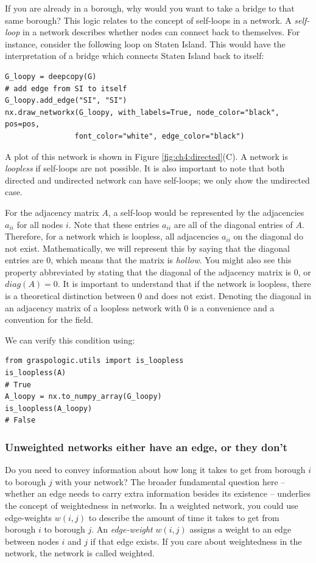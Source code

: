 If you are already in a borough, why would you want to take a bridge to that same borough? This logic relates to the concept of {self-loops} in a network. A \textit{self-loop} in a network describes whether nodes can connect back to themselves. For instance, consider the following loop on Staten Island. This would have the interpretation of a bridge which connects Staten Island back to itself:
\begin{lstlisting}[style=python]
G_loopy = deepcopy(G)
# add edge from SI to itself
G_loopy.add_edge("SI", "SI")
nx.draw_networkx(G_loopy, with_labels=True, node_color="black", pos=pos,
                font_color="white", edge_color="black")
\end{lstlisting}

A plot of this network is shown in Figure \ref{fig:ch4:directed}(C). A network is \textit{loopless} if self-loops are not possible. It is also important to note that both directed and undirected network can have self-loops; we only show the undirected case.

For the adjacency matrix $A$, a self-loop would be represented by the adjacencies $a_{ii}$ for all nodes $i$. Note that these entries $a_{ii}$ are all of the {diagonal} entries of $A$. Therefore, for a network which is loopless, all adjacencies $a_{ii}$ on the diagonal {do not exist}. Mathematically, we will represent this by saying that the diagonal entries are $0$, which means that the matrix is \textit{hollow}. You might also see this property abbreviated by stating that the diagonal of the adjacency matrix is $0$, or $diag(A) = 0$. It is important to understand that if the network is loopless, there is a theoretical distinction between $0$ and {does not exist}. Denoting the diagonal in an adjacency matrix of a loopless network with $0$ is a convenience and a convention for the field.

We can verify this condition using: 

\begin{lstlisting}[style=python]
from graspologic.utils import is_loopless
is_loopless(A)
# True
A_loopy = nx.to_numpy_array(G_loopy)
is_loopless(A_loopy)
# False
\end{lstlisting}


\subsubsection{Unweighted networks either have an edge, or they don't}

Do you need to convey information about how long it takes to get from borough $i$ to borough $j$ with your network? The broader fundamental question here -- whether an edge needs to carry extra information besides its existence -- underlies the concept of {weightedness} in networks. In a weighted network, you could use {edge-weights} $w(i, j)$ to describe the amount of time it takes to get from borough $i$ to borough $j$. An \textit{edge-weight} $w(i,j)$ assigns a weight to an edge between nodes $i$ and $j$ if that edge exists. If you care about weightedness in the network, the network is called {weighted}. 

